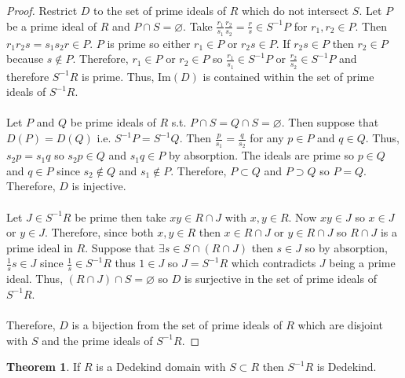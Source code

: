\documentclass[12pt]{extarticle}
\renewcommand{\Im}[1]{\mathrm{Im}(#1)}
\theoremstyle{definition}
\newtheorem{theorem}{Theorem}[section]
\begin{document}
\begin{proof}
Restrict $D$ to the set of prime ideals of $R$ which do not intersect $S$. Let $P$ be a prime ideal of $R$ and $P \cap S = \varnothing$. Take $\frac{r_1}{s_1} \frac{r_2}{s_2} = \frac{r}{s} \in S^{-1} P$ for $r_1, r_2 \in P$. Then $r_1 r_2 s = s_1 s_2 r \in P$. $P$ is prime so either $r_1 \in P$ or $r_2 s \in P$. If $r_2 s \in P$ then $r_2 \in P$ because $s \notin P$. Therefore, $r_1 \in P$ or $r_2 \in P$ so $\frac{r_1}{s_1} \in S^{-1}P$ or $\frac{r_2}{s_2} \in S^{-1} P$ and therefore $S^{-1} R$ is prime. Thus, $\Im{D}$ is contained within the set of prime ideals of $S^{-1} R$. \\ \\
Let $P$ and $Q$ be prime ideals of $R$ s.t. $P \cap S = Q \cap S = \varnothing$. Then suppose that $D(P) = D(Q)$ i.e. $S^{-1}P = S^{-1}Q$. Then $\frac{p}{s_1} = \frac{q}{s_2}$ for any $p \in P$ and $q \in Q$. Thus, $s_2 p = s_1 q$ so $s_2 p \in Q$ and $s_1 q \in P$ by absorption. The ideals are prime so $p \in Q$ and $q \in P$ since $s_2 \notin Q$ and $s_1 \notin P$. Therefore, $P \subset Q$ and $P \supset Q$ so $P = Q$. Therefore, $D$ is injective. \\ \\
Let $J \in S^{-1}R$ be prime then take $xy \in R \cap J$ with $x,y \in R$. Now $xy \in J$ so $x \in J$ or $y \in J$. Therefore, since both $x,y \in R$ then $x \in R \cap J$ or $y \in R \cap J$ so $R \cap J$ is a prime ideal in $R$. Suppose that $\exists s \in S \cap (R \cap J)$ then $s \in J$ so by absorption, $\frac{1}{s} s \in J$ since $\frac{1}{s} \in S^{-1} R$ thus $1 \in J$ so $J = S^{-1}R$ which contradicts $J$ being a prime ideal. Thus, $(R \cap J) \cap S  = \varnothing$ so $D$ is surjective in the set of prime ideals of $S^{-1}R$. \\ \\
Therefore, $D$ is a bijection from the set of prime ideals of $R$ which are disjoint with $S$ and the prime ideals of $S^{-1}R$. 
\end{proof}

\begin{theorem}
If $R$ is a Dedekind domain with $S \subset R$ then $S^{-1} R$ is Dedekind.
\end{theorem}
\end{document}
